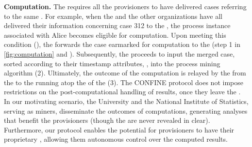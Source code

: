 \noindent\textbf{Computation.} The  requires all the provisioners to have delivered cases referring to the same . For example, when the  and the other organizations have all delivered their information concerning case 312 to the , the process instance associated with Alice becomes eligible for computation. Upon meeting this condition (), the  forwards the case earmarked for computation to the  (step 1 in \cref{fig:computation} and ). Subsequently, the  proceeds to input the merged case, sorted according to their timestamp attributes, , into the process mining algorithm (2). Ultimately, the outcome of the computation is relayed by the  from the  to the  running atop the  of the  (3). The CONFINE protocol does not impose restrictions on the post-computational handling of results, once they leave the . In our motivating scenario, the University and the National Institute of Statistics, serving as miners, disseminate the outcomes of computations, generating analyses that benefit the provisioners (though the  are never revealed in clear). Furthermore, our protocol enables the potential for provisioners to have their proprietary , allowing them autonomous control over the computed results. %

